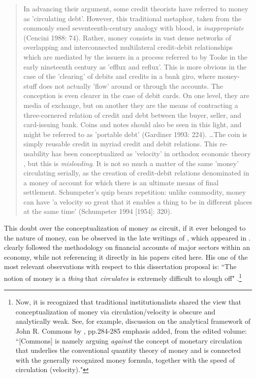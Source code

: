 \begin{quote}
In advancing their argument, some credit theorists have referred to money as 'circulating debt'. However, this traditional metaphor, taken from the commonly sued seventeenth-century analogy with blood, is \textit{inappropriate} (Cencini 1988: 74). Rather, money consists in vast dense networks of overlapping and interconnected multilateral credit-debit relationships which are mediated by the issuers in a process referred to by Tooke in the early nineteenth century as 'efflux and reflux'. This is more obvious in the case of the 'clearing' of debits and credits in a bank giro, where money-stuff does not actually 'flow' around or through the accounts. The conception is even clearer in the case of debit cards. On one level, they are media of exchange, but on another they are the means of contracting a three-cornered relation of credit and debt between the buyer, seller, and card-issuing bank. Coins and notes should also be seen in this light, and might be referred to as 'portable debt' (Gardiner 1993: 224). \dots The coin is simply reusable credit in myriad credit and debit relations. This re-usability has been conceptualized as 'velocity' in orthodox economic theory , but this is \textit{misleading}. It is not so much a matter of the same 'money' circulating serially, as the creation of credit-debit relations denominated in a money of account for which there is an ultimate means of final settlement. Schumpeter's quip bears repetition: unlike commodity, money can have 'a velocity so great that it enables a thing to be in different places at the same time' (Schumpeter 1994 [1954]: 320). \citep[p.~73-74, emphasis added]{ingham2004}
\end{quote}

This doubt over the conceptualization of money as circuit, if it ever belonged to the nature of money, can be observed in the late writings of \cite{earley1994}, which appeared in \cite{dymski1994}. \citeauthor{earley1994} clearly followed the \cite{copeland1952} methodology on financial accounts of major sectors within an economy, while not referencing it directly in his papers cited here.
His one of the most relevant observations with respect to this dissertation proposal is: ``The notion of money is a \textit{thing} that \textit{circulates} is extremely difficult to slough off" \citep[pp.~346-347, emphasis original]{earley1994}.\footnote{Now, it is recognized that traditional institutionalists shared the view that conceptualization of money via circulation/velocity is obscure and analytically weak. See, for example, discussion on the analytical framework of John R. Commons by \cite{fiedler2022}, pp.284-285 emphasis added, from the \cite{biggiero2022} edited volume: ``[Commons] is namely arguing \textit{against} the concept of monetary circulation that underlies the conventional quantity theory of money and is connected with the generally recognized money formula, together with the speed of circulation (velocity)."}


